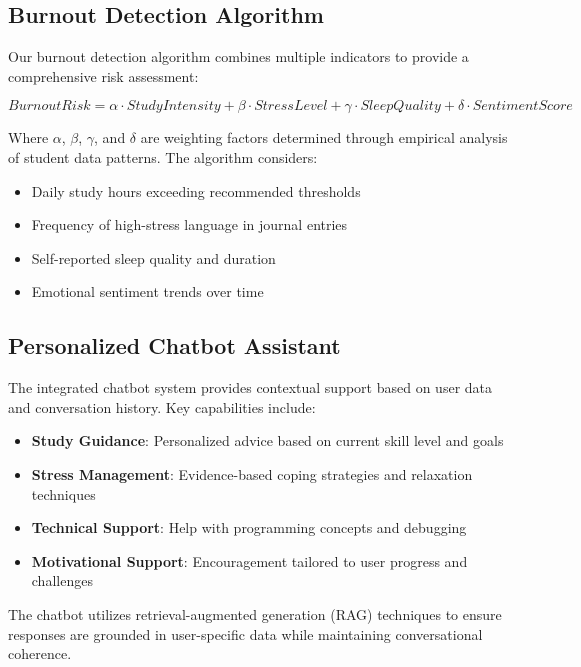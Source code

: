 \documentclass[conference,10pt]{IEEEtran}
\begin{document}
\subsection{Burnout Detection Algorithm}

Our burnout detection algorithm combines multiple indicators to provide a comprehensive risk assessment:

\begin{equation}
BurnoutRisk = \alpha \cdot StudyIntensity + \beta \cdot StressLevel + \gamma \cdot SleepQuality + \delta \cdot SentimentScore
\end{equation}

Where $\alpha$, $\beta$, $\gamma$, and $\delta$ are weighting factors determined through empirical analysis of student data patterns. The algorithm considers:

\begin{itemize}
\item Daily study hours exceeding recommended thresholds
\item Frequency of high-stress language in journal entries
\item Self-reported sleep quality and duration
\item Emotional sentiment trends over time
\end{itemize}

\subsection{Personalized Chatbot Assistant}

The integrated chatbot system provides contextual support based on user data and conversation history. Key capabilities include:

\begin{itemize}
\item \textbf{Study Guidance}: Personalized advice based on current skill level and goals
\item \textbf{Stress Management}: Evidence-based coping strategies and relaxation techniques
\item \textbf{Technical Support}: Help with programming concepts and debugging
\item \textbf{Motivational Support}: Encouragement tailored to user progress and challenges
\end{itemize}

The chatbot utilizes retrieval-augmented generation (RAG) techniques to ensure responses are grounded in user-specific data while maintaining conversational coherence.
\end{document}
